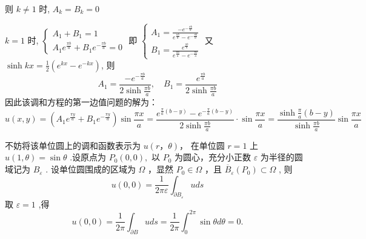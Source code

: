 \begin{questions}
\begin{solution}
则 $ k \neq 1 $ 时, $ A_{k}=B_{k}=0 $

$ k=1 $ 时, $ \left\{\begin{array}{c}A_{1}+B_{1}=1 \\ A_{1} e^{\frac{\pi b}{a}}+B_{1} e^{-\frac{\pi b}{a}}=0\end{array}\right. $ 即 $ \left\{\begin{array}{l}A_{1}=\frac{-e^{-\frac{\pi b}{a}}}{e^{\frac{\pi b}{a}}-e^{-\frac{\pi b}{a}}} \\ B_{1}=\frac{e^{\frac{\pi b}{a}}}{e^{\frac{\pi b}{a}}-e^{-\frac{\pi b}{a}}}\end{array}\right. $
又 $\sinh k x=\frac{1}{2} ( e^{k x}-e^{-k x}) $, 则 
$$ A_{1}=\frac{-e^{-\frac{\pi b}{a}}}{2 \sinh \frac{\pi b}{a}},\quad B_{1}=\frac{e^{\frac{\pi b}{a}}}{2 \sinh \frac{\pi b}{a}} $$
因此该调和方程的第一边值问题的解为：
$$ 
u(x, y)=\left(A_{1} e^{\frac{\pi y}{a}}+B_{1} e^{-\frac{\pi y}{a}}\right) \sin \frac{\pi x}{a} =\frac{e^{\frac{\pi}{a}(b-y)}-e^{-\frac{\pi}{a}(b-y)}}{2 \sinh \frac{\pi b}{a}} \cdot \sin \frac{\pi x}{a}=\frac{\sinh \frac{\pi}{a}(b-y)}{\sinh \frac{\pi b}{a}} \sin \frac{\pi x}{a}$$


\end{solution}

\begin{solution}
    不妨将该单位圆上的调和函数表示为 $ u(r ， \theta) $， 在单位圆 $ r=1 $ 上 $ u(1, \theta)=\sin \theta $ .设原点为 $ P_{0}(0,0) ,$ 以 $ P_{0} $ 为圆心，充分小正数 $ \varepsilon $ 为半径的圆域记为 $ B_{\varepsilon} $ . 设单位圆围成的区域为 $ \Omega $ ，显然 $ P_{0} \in \Omega $ ，且 $ \overline{B}_{\varepsilon}\left(P_{0}\right) \subset \Omega $ , 则
    $$ u(0,0)=\frac{1}{2 \pi \varepsilon} \int_{\partial B_{\varepsilon}} u d s $$
    取 $ \varepsilon=1 $ ,得 $$ u(0,0)=\frac{1}{2 \pi} \int_{\partial B} u d s=\frac{1}{2 \pi} \int_{0}^{2 \pi} \sin \theta d \theta=0 .$$
\end{solution}
    
\end{questions}
